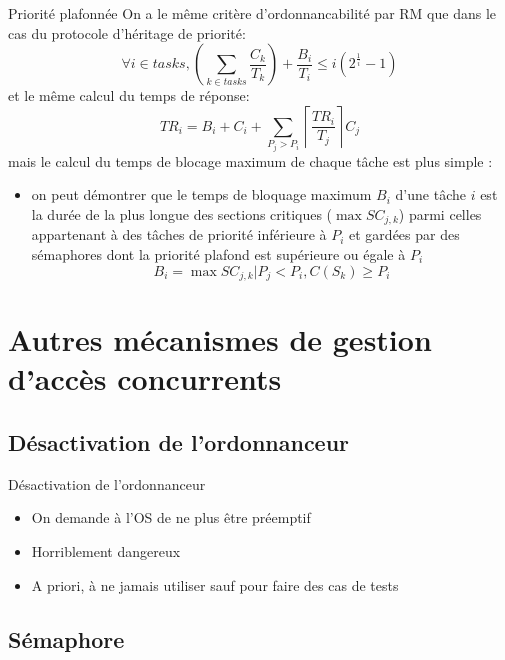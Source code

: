 \begin{frame}{Priorité plafonnée} 
  On a  le même critère d'ordonnancabilité  par RM que dans  le cas du
  protocole d'héritage de priorité:
  $$\forall i \in tasks, \left( \sum_{k \in tasks} \frac{C_k}{T_k} \right) + \frac{B_i}{T_i} ≤ i \left(2^{\frac{1}{i}}-1\right)$$
  et le même calcul du temps de réponse:
  $$TR_i = B_i + C_i + \sum_{P_j > P_i} \left\lceil\frac{TR_i}{T_j}\right\rceil C_j$$
  mais le calcul du temps de  blocage maximum de chaque tâche est plus
  simple :
  \begin{itemize}
  \item on peut démontrer que le temps de bloquage maximum $B_i$ d'une
    tâche $i$  est la durée de  la plus longue  des sections critiques
    ($\max  SC_{j,k}$)  parmi  celles  appartenant  à  des  tâches  de
    priorité inférieure à $P_i$ et  gardées par des sémaphores dont la
    priorité plafond est supérieure ou égale à $P_i$
    $$B_i = \max SC_{j,k} | P_j < P_i, C(S_k) ≥ P_i$$ 
  \end{itemize}
\end{frame}


\section{Autres mécanismes de gestion d'accès concurrents}


\subsection{Désactivation de l'ordonnanceur}

\begin{frame}{Désactivation de l'ordonnanceur}
  \begin{itemize} 
  \item On demande à l'OS de ne plus être préemptif
  \item Horriblement dangereux
  \item A  priori, à  ne jamais  utiliser sauf pour  faire des  cas de
    tests
  \end{itemize} 
\end{frame} 

\subsection{Sémaphore}

